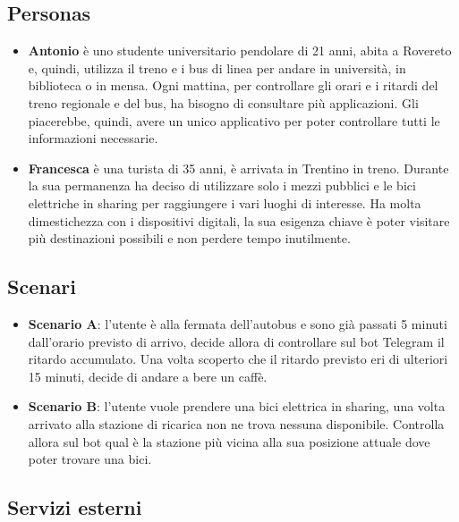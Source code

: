 \subsection{Personas}
\begin{itemize}
\item \textbf{Antonio} è uno studente universitario pendolare di 21 anni, abita a Rovereto e, quindi, utilizza il treno e i bus di linea per andare in università, in biblioteca o in mensa. Ogni mattina, per controllare gli orari e i ritardi del treno regionale e del bus, ha bisogno di consultare più applicazioni. Gli piacerebbe, quindi, avere un unico applicativo per poter controllare tutti le informazioni necessarie.
\item \textbf{Francesca} è una turista di 35 anni, è arrivata in Trentino in treno. Durante la sua permanenza ha deciso di utilizzare solo i mezzi pubblici e le bici elettriche in sharing per raggiungere i vari luoghi di interesse. Ha molta dimestichezza con i dispositivi digitali, la sua esigenza chiave è poter visitare più destinazioni possibili e non perdere tempo inutilmente.  
\end{itemize}

\subsection{Scenari}
\begin{itemize}
\item \textbf{Scenario A}: l'utente è alla fermata dell'autobus e sono già passati 5 minuti dall'orario previsto di arrivo, decide allora di controllare sul bot Telegram il ritardo accumulato. Una volta scoperto che il ritardo previsto eri di ulteriori 15 minuti, decide di andare a bere un caffè. 
\item \textbf{Scenario B}: l'utente vuole prendere una bici elettrica in sharing, una volta arrivato alla stazione di ricarica non ne trova nessuna disponibile. Controlla allora sul bot qual è la stazione più vicina alla sua posizione attuale dove poter trovare una bici. 
\end{itemize}


\subsection{Servizi esterni}

